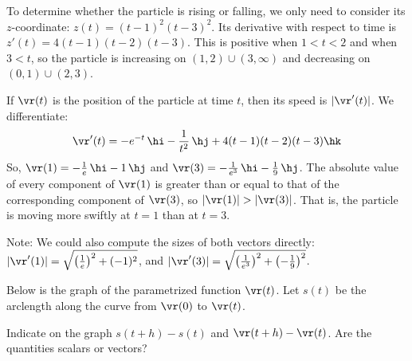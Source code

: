 \begin{solution}
To determine whether the particle is rising or falling, we only need to consider its $z$-coordinate: $z(t)=(t-1)^2(t-3)^2$. Its derivative with respect to time is $z'(t)=4(t-1)(t-2)(t-3)$. This is positive when $1<t<2$ and when $3<t$, so the particle is increasing on $(1,2) \cup (3,\infty)$ and decreasing on $(0,1) \cup (2,3)$.

If $\vr(t)$ is the position of the particle at time $t$, then its speed is $|\vr'(t)|$. We differentiate:
\[\vr'(t)=-e^{-t}\,\hi-\frac{1}{t^2}\,\hj+4(t-1)(t-2)(t-3)\hk\]
So, $\vr(1)=-\frac{1}{e}\,\hi-1\,\hj$ and $\vr(3)=-\frac{1}{e^3}\,\hi-\frac{1}{9}\,\hj$. The absolute value of every component of $\vr(1)$ is greater than or equal to that of the corresponding component of $\vr(3)$, so $|\vr(1)|>|\vr(3)|$. That is, the particle is moving more swiftly at $t=1$ than at $t=3$.

Note: We could also compute the sizes of both vectors directly: $|\vr'(1)|=\sqrt{\left(\frac{1}{e}\right)^2+(-1)^2}$, and $|\vr'(3)|=\sqrt{\left(\frac{1}{e^3}\right)^2+\left(-\frac{1}{9}\right)^2}$.
\end{solution}
\begin{question}
Below is the graph of the parametrized function $\vr(t)$. Let $s(t)$ be the arclength along the curve from $\vr(0)$ to $\vr(t)$.

\begin{center}
\end{center}
Indicate on the graph $s(t+h)-s(t)$ and $\vr(t+h)-\vr(t)$. Are the quantities scalars or vectors?


\end{question}
